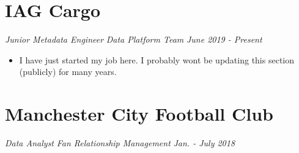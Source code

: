 \documentclass[letterpaper,11pt]{article}
\begin{document}

\section{IAG Cargo}
\textit{Junior Metadata Engineer}
\hfill
\textit{Data Platform Team}
\hfill
\textit{June 2019 - Present}
\begin{itemize}
	\item I have just started my job here. I probably wont be updating this section (publicly) for many years.
\end{itemize}

\section{Manchester City Football Club}
\textit{Data Analyst}
\hfill
\textit{Fan Relationship Management}
\hfill
\textit{Jan. - July 2018}
\end{document}
